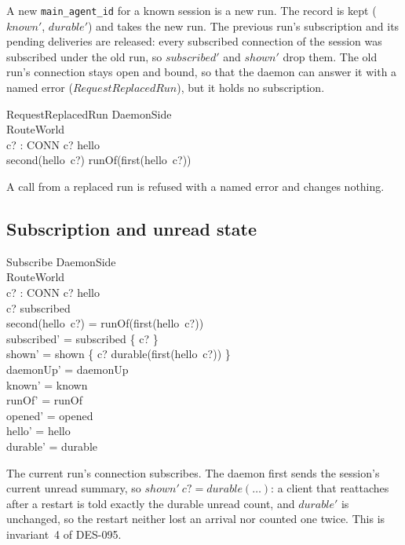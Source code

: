 \documentclass[a4paper,10pt,fleqn]{article}
\begin{document}
A new \texttt{main\_agent\_id} for a known session is a new run.  The
record is kept ($known'$, $durable'$) and takes the new run.  The previous
run's subscription and its pending deliveries are released: every
subscribed connection of the session was subscribed under the old run, so
$subscribed'$ and $shown'$ drop them.  The old run's connection stays open
and bound, so that the daemon can answer it with a named error
($RequestReplacedRun$), but it holds no subscription.

\begin{schema}{RequestReplacedRun}
  \Xi DaemonSide \\
  \Xi RouteWorld \\
  c? : CONN
  \where
  c? \in \dom hello \\
  second(hello~c?) \neq runOf(first(hello~c?))
\end{schema}

A call from a replaced run is refused with a named error and changes
nothing.

\subsection{Subscription and unread state}

\begin{schema}{Subscribe}
  \Delta DaemonSide \\
  \Xi RouteWorld \\
  c? : CONN
  \where
  c? \in \dom hello \\
  c? \notin subscribed \\
  second(hello~c?) = runOf(first(hello~c?)) \\
  subscribed' = subscribed \cup \{ c? \} \\
  shown' = shown \cup \{ c? \mapsto durable(first(hello~c?)) \} \\
  daemonUp' = daemonUp \\
  known' = known \\
  runOf' = runOf \\
  opened' = opened \\
  hello' = hello \\
  durable' = durable
\end{schema}

The current run's connection subscribes.  The daemon first sends the
session's current unread summary, so $shown'~c? = durable(\ldots)$: a
client that reattaches after a restart is told exactly the durable unread
count, and $durable'$ is unchanged, so the restart neither lost an arrival
nor counted one twice.  This is invariant~4 of DES-095.
\end{document}
